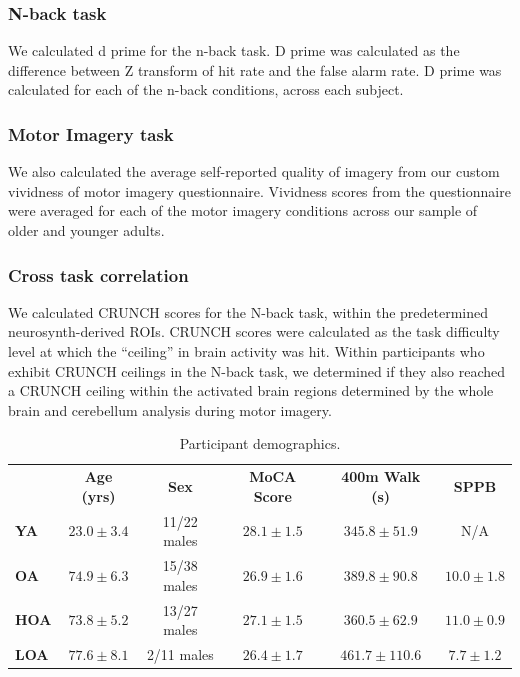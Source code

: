 \documentclass[a4paper,fleqn]{cas-sc}
\begin{document}
\subsubsection{N-back task}
We calculated d prime for the n-back task. D prime was calculated as the difference between Z transform of hit rate and the false alarm rate. D prime was calculated for each of the n-back conditions, across each subject.

\subsubsection{Motor Imagery task}
We also calculated the average self-reported quality of imagery from our custom vividness of motor imagery questionnaire. Vividness scores from the questionnaire were averaged for each of the motor imagery conditions across our sample of older and younger adults.

\subsubsection{Cross task correlation}
We calculated CRUNCH scores for the N-back task, within the predetermined neurosynth-derived ROIs. CRUNCH scores were calculated as the task difficulty level at which the “ceiling” in brain activity was hit. Within participants who exhibit CRUNCH ceilings in the N-back task, we determined if they also reached a CRUNCH ceiling within the activated brain regions determined by the whole brain and cerebellum analysis during motor imagery.

\begin{table}[h!]
\caption{Participant demographics.}\label{tab:demographics}
\centering
\begin{tabular}{lccccc}
\textbf{} & \textbf{Age (yrs)} & \textbf{Sex} & \textbf{MoCA Score} & \textbf{400m Walk (s)} & \textbf{SPPB} \\ 
\textbf{YA} & $23.0 \pm 3.4$ & 11/22 males & $28.1 \pm 1.5$ & $345.8 \pm 51.9$ & N/A \\ 
\textbf{OA} & $74.9 \pm 6.3$ & 15/38 males & $26.9 \pm 1.6$ & $389.8 \pm 90.8$ & $10.0 \pm 1.8$ \\ 
\textbf{HOA} & $73.8 \pm 5.2$ & 13/27 males & $27.1 \pm 1.5$ & $360.5 \pm 62.9$ & $11.0 \pm 0.9$ \\ 
\textbf{LOA} & $77.6 \pm 8.1$ & 2/11 males & $26.4 \pm 1.7$ & $461.7 \pm 110.6$ & $7.7 \pm 1.2$ \\ 
\end{tabular}
\end{table}
\end{document}
